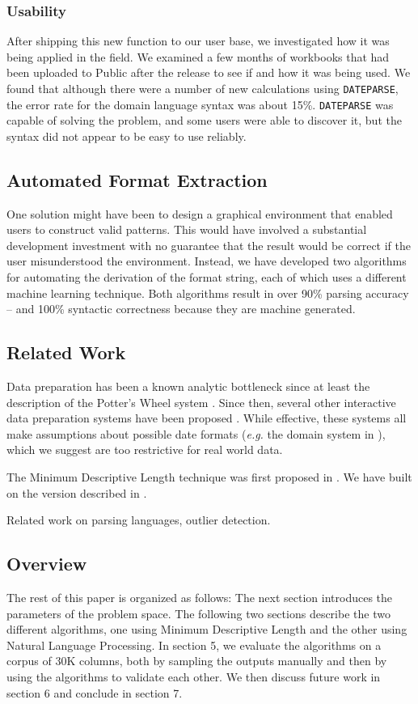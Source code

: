 \subsubsection{	Usability}
After shipping this new function to our user base, we investigated how it was being applied in the field. We examined a few months of workbooks that had been uploaded to Public after the release to see if and how it was being used. We found that although there were a number of new calculations using \texttt{DATEPARSE}, the error rate for the domain language syntax was about 15\%. \texttt{DATEPARSE} was capable of solving the problem, and some users were able to discover it, but the syntax did not appear to be easy to use reliably.

\subsection{Automated Format Extraction}
One solution might have been to design a graphical environment that enabled users to construct valid patterns. This would have involved a substantial development investment with no guarantee that the result would be correct if the user misunderstood the environment. Instead, we have developed two algorithms for automating the derivation of the format string, each of which uses a different machine learning technique. Both algorithms result in over 90\% parsing accuracy -- and 100\% syntactic correctness because they are machine generated.


\subsection{Related Work}
Data preparation has been a known analytic bottleneck since at least the description of the Potter's Wheel system \cite{Raman:2001}. Since then, several other interactive data preparation systems have been proposed \cite{Kandel:2011,Refine}. While effective, these systems all make assumptions about possible date formats (\textit{e.g.} the domain system in \cite{PottersWheel}), which we suggest are too restrictive for real world data.

The Minimum Descriptive Length technique was first proposed in \cite{mdl}.  We have built on the version described in \cite{PottersWheel}.

Related work on parsing languages, outlier detection.

\subsection{Overview}
The rest of this paper is organized as follows: The next section introduces the parameters of the problem space. The following two sections describe the two different algorithms, one using Minimum Descriptive Length and the other using Natural Language Processing. In section 5, we evaluate the algorithms on a corpus of 30K columns, both by sampling the outputs manually and then by using the algorithms to validate each other. We then discuss future work in section 6 and conclude in section 7.
